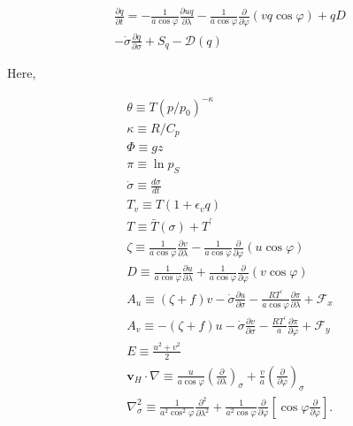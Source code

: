 \begin{eqnarray}
  \frac{\partial q}{\partial t}
   =  - \frac{1}{a\cos\varphi}
               \frac{\partial uq}{\partial \lambda}
          - \frac{1}{a\cos\varphi}
               \frac{\partial }{\partial \varphi} (vq \cos\varphi)
          + q D  \\
        - \dot{\sigma} \frac{\partial q }{\partial \sigma}
          + S_{q}
          - {\mathcal D}(q) 
\end{eqnarray}

Here,

\begin{eqnarray}
\theta  \equiv  T \left( p/p_{0} \right)^{-\kappa} \\
\kappa  \equiv  R/C_{p} \\
  \Phi  \equiv  gz \\
   \pi  \equiv  \ln p_{S} \\
%
 \dot{\sigma}  \equiv   \frac{d \sigma}{d t} \\
%
     T_v  \equiv  T ( 1+\epsilon_v q ) \\
     T  \equiv   \bar{T}(\sigma) + T^{\prime} \\
%
 \zeta  \equiv  \frac{1}{a \cos\varphi }
                    \frac{\partial v}{\partial \lambda} 
             -    \frac{1}{a \cos\varphi }
                    \frac{\partial }{\partial \varphi}
                    ( u \cos\varphi ) \\
%
     D  \equiv  \frac{1}{a \cos\varphi }
                    \frac{\partial u}{\partial \lambda} 
             +    \frac{1}{a \cos\varphi }
                    \frac{\partial }{\partial \varphi}
                    ( v \cos\varphi ) \\
%
    A_u  \equiv   ( \zeta + f ) v
             - \dot{\sigma} \frac{\partial u}{\partial \sigma} 
             - \frac{RT^{\prime}}{a\cos\varphi} 
                  \frac{\partial \pi}{\partial \lambda} 
             + {\mathcal F}_x \\
%
    A_v  \equiv  - ( \zeta + f ) u
             - \dot{\sigma} \frac{\partial v}{\partial \sigma} 
             - \frac{RT^{\prime}}{a}
                  \frac{\partial \pi}{\partial \varphi} 
             + {\mathcal F}_y \\
%
     E  \equiv   \frac{u^{2}+v^{2}}{2} \\
%
 \mathbf{v}_{H} \cdot \nabla
        \equiv  \frac{u}{a \cos \varphi} 
         \left( \frac{\partial }{\partial \lambda} \right)_{\sigma}
     + \frac{v}{a}
         \left( \frac{\partial }{\partial \varphi} \right)_{\sigma} 
            \\
  \nabla^{2}_{\sigma}  
        \equiv  
               \frac{1}{a^{2}\cos^2\varphi} 
                 \frac{\partial^{2} }{\partial \lambda^{2}} 
             + \frac{1}{a^{2}\cos\varphi} 
                 \frac{\partial }{\partial \varphi}
                 \left[ \cos\varphi
                       \frac{\partial }{\partial \varphi} \right]  .
\end{eqnarray}

